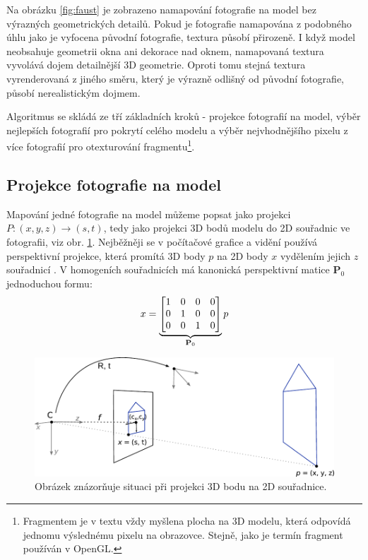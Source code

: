 \documentclass[11pt,twoside,a4paper]{book}
\begin{document}
Na obrázku \ref{fig:faust} je zobrazeno namapování fotografie na model bez výrazných geometrických detailů. Pokud je fotografie namapována z podobného úhlu jako je vyfocena původní fotografie, textura působí přirozeně. I když model neobsahuje geometrii okna ani dekorace nad oknem, namapovaná textura vyvolává dojem detailnější 3D geometrie. Oproti tomu stejná textura vyrenderovaná z jiného směru, který je výrazně odlišný od původní fotografie, působí nerealistickým dojmem.


Algoritmus se skládá ze tří základních kroků - projekce fotografií na model, výběr nejlepších fotografií pro pokrytí celého modelu a výběr nejvhodnějšího pixelu z více fotografií pro otexturování fragmentu\footnote{Fragmentem je v textu vždy myšlena plocha na 3D modelu, která odpovídá jednomu výslednému pixelu na obrazovce. Stejně, jako je termín fragment používán v OpenGL.}.

\subsection{Projekce fotografie na model}
\label{sec:matice-kamery}

Mapování jedné fotografie na model můžeme popsat jako projekci $P: (x, y, z) \to (s, t)$, tedy jako projekci 3D bodů modelu do 2D souřadnic ve fotografii, viz obr. \ref{fig:camera-projection}. Nejběžněji se v počítačové grafice a vidění používá perspektivní projekce, která promítá 3D body $p$ na 2D body $x$ vydělením jejich $z$ souřadnicí \cite{Szeliski}. V homogeních souřadnicích má kanonická perspektivní matice \textbf{P}$_0$ jednoduchou formu:
\begin{align}
\label{eq:persp-projection}
x = 
\underbrace{
\begin{bmatrix}
1 & 0 & 0 & 0 \\
0 & 1 & 0 & 0 \\
0 & 0 & 1 & 0 \\
\end{bmatrix}}_\text{\textbf{P}$_0$}
p
\end{align}
\noindent

\begin{figure}[t]
\begin{center}
\includegraphics[width=\textwidth]{figures/camera-projection}
\caption{Obrázek znázorňuje situaci při projekci 3D bodu na 2D souřadnice.}
\label{fig:camera-projection}
\end{center}
\end{figure}
\end{document}
